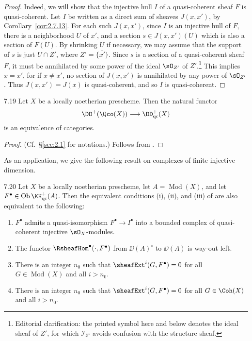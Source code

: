 \begin{proof}
Indeed, we will show that the injective hull $I$ of a quasi-coherent sheaf $F$ is quasi-coherent. Let $I$ be written as a direct sum of sheaves $J(x,x')$, by Corollary~\ref{cor:2.7.13}. For each such $J(x,x')$, since $I$ is an injective hull of $F$, there is a neighborhood $U$ of $x'$, and a section $s\in J(x,x')(U)$ which is also a section of $F(U)$. By shrinking $U$ if necessary, we may assume that the support of $s$ is just $U\cap Z'$, where $Z'=\overline{\{x'\}}$. Since $s$ is a section of a quasi-coherent sheaf $F$, it must be annihilated by some power of the ideal $\sO_{Z'}$ of $Z'$.\footnote{Editorial clarification: the printed symbol here and below denotes the ideal sheaf of $Z'$, for which $\mathcal I_{Z'}$ avoids confusion with the structure sheaf.} This implies $x=x'$, for if $x\neq x'$, no section of $J(x,x')$ is annihilated by any power of $\sO_{Z'}$. Thus $J(x,x')=J(x)$ is quasi-coherent, and so $I$ is quasi-coherent.
\end{proof}

\begin{bookcorollary}{7.19}\label{cor:2.7.19}
Let $X$ be a locally noetherian prescheme. Then the natural functor
\[
\DD^+(\Qco(X)) \longrightarrow \DD_{\mathrm{qc}}^+(X)
\]
is an equivalence of categories.
\end{bookcorollary}

\begin{proof}
(Cf.\ \S\ref{sec:2.1} for notations.) Follows from .
\end{proof}

As an application, we give the following result on complexes of finite injective dimension.

\begin{bookproposition}{7.20}\label{prop:2.7.20}
Let $X$ be a locally noetherian prescheme, let $A=\operatorname{Mod}(X)$, and let $F^\bullet\in\operatorname{Ob}\KK_{\mathrm{qc}}^+(A)$. Then the equivalent conditions (i), (ii), and (iii) of  are also equivalent to the following:
\begin{enumerate}
\item[(i)${}_{\mathrm{qc}}$] $F^\bullet$ admits a quasi-isomorphism $F^\bullet\to I^\bullet$ into a bounded complex of quasi-coherent injective $\sO_X$-modules.
\item[$\underline{(ii)}$] The functor $\RsheafHom^\bullet(\cdot,F^\bullet)$ from $\DD(A)^\circ$ to $\DD(A)$ is way-out left.
\item[$\underline{(iii)}$] There is an integer $n_0$ such that $\sheafExt^i(G,F^\bullet)=0$ for all $G\in\operatorname{Mod}(X)$ and all $i>n_0$.
\item[$\underline{(iii)}_{\mathrm{c}}$] There is an integer $n_0$ such that $\sheafExt^i(G,F^\bullet)=0$ for all $G\in\Coh(X)$ and all $i>n_0$.
\end{enumerate}
\end{bookproposition}

